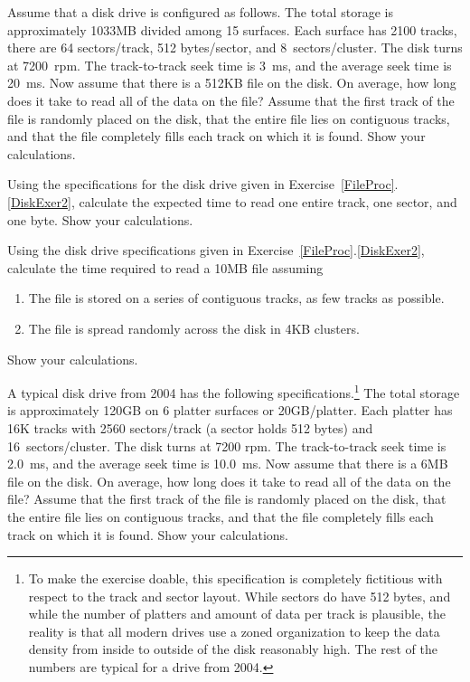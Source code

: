 \begin{exercises}
\item
\label{DiskExer2}
Assume that a disk drive
is configured as follows.
The total storage is approximately 1033MB divided among 15 surfaces.
Each surface has 2100 tracks, there are 64 sectors/track,
512 bytes/sector, and 8~sectors/cluster.
The disk turns at 7200~rpm.
The track-to-track seek time is 3~ms, and the average seek time is
20~ms.
Now assume that there is a 512KB file on the disk.
On average, how long does it take to read all of the data on the file?
Assume that the first track of the file is randomly placed on the
disk, that the entire file lies on contiguous tracks, and that the file
completely fills each track on which it is found.
Show your calculations.

\item
Using the specifications for the disk drive given in
Exercise~\ref{FileProc}.\ref{DiskExer2}, calculate the expected time
to read one entire track, one sector, and one byte.
Show your calculations.

\item
Using the disk drive specifications given in
Exercise~\ref{FileProc}.\ref{DiskExer2},
calculate the time required to read a 10MB file assuming
\begin{enumerate}
\item The file is stored on a series of contiguous tracks, as few
tracks as possible.
\item The file is spread randomly across the disk in 4KB clusters.
\end{enumerate}
\noindent Show your calculations.

\item
\label{DiskExer3}
A typical disk drive from 2004 has the following
specifications.\footnote{To make the exercise doable,
this specification is completely fictitious
with respect to the track and sector layout.
While sectors do have 512 bytes, and while the number of platters and
amount of data per track is plausible, the reality is that all modern
drives use a zoned organization to keep the data density from inside
to outside of the disk reasonably high. The rest of the numbers are
typical for a drive from 2004.}
The total storage is approximately 120GB on 6 platter surfaces or
20GB/platter.
Each platter has 16K tracks with 2560 sectors/track (a sector
holds 512 bytes) and 16~sectors/cluster.
The disk turns at 7200 rpm.
The track-to-track seek time is 2.0~ms, and the average seek time is
10.0~ms.
Now assume that there is a 6MB file on the disk.
On average, how long does it take to read all of the data on the file?
Assume that the first track of the file is randomly placed on the
disk, that the entire file lies on contiguous tracks, and that the file
completely fills each track on which it is found.
Show your calculations.


\end{exercises}
